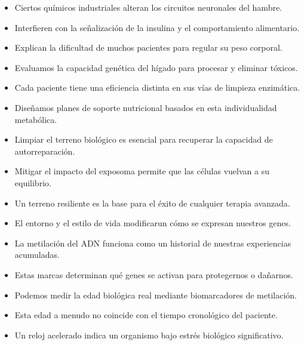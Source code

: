         \begin{itemize}
            \item Ciertos químicos industriales alteran los circuitos neuronales del hambre.
            \item Interfieren con la señalización de la insulina y el comportamiento alimentario.
            \item Explican la dificultad de muchos pacientes para regular su peso corporal.
        \end{itemize}

        \begin{itemize}
            \item Evaluamos la capacidad genética del hígado para procesar y eliminar tóxicos.
            \item Cada paciente tiene una eficiencia distinta en sus vías de limpieza enzimática.
            \item Diseñamos planes de soporte nutricional basados en esta individualidad metabólica.
        \end{itemize}

        \begin{itemize}
            \item Limpiar el terreno biológico es esencial para recuperar la capacidad de autorreparación.
            \item Mitigar el impacto del exposoma permite que las células vuelvan a su equilibrio.
            \item Un terreno resiliente es la base para el éxito de cualquier terapia avanzada.
        \end{itemize}

        \begin{itemize}
            \item El entorno y el estilo de vida modificarun cómo se expresan nuestros genes.
            \item La metilación del ADN funciona como un historial de nuestras experiencias acumuladas.
            \item Estas marcas determinan qué genes se activan para protegernos o dañarnos.
        \end{itemize}

        \begin{itemize}
            \item Podemos medir la edad biológica real mediante biomarcadores de metilación.
            \item Esta edad a menudo no coincide con el tiempo cronológico del paciente.
            \item Un reloj acelerado indica un organismo bajo estrés biológico significativo.
        \end{itemize}

